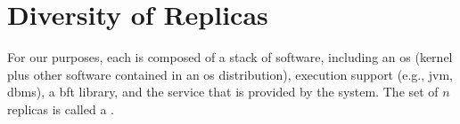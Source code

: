 




\section{Diversity of Replicas}
\label{sec:diversityofreplicas}

For our purposes, each \replica is composed of a stack of software, including an \gls{os} (kernel plus other software contained in an \gls{os} distribution), execution support (e.g., \gls{jvm}, \gls{dbms}), a \gls{bft} library, and the service that is provided by the system.
The set of $n$ replicas is called a \configuration.



